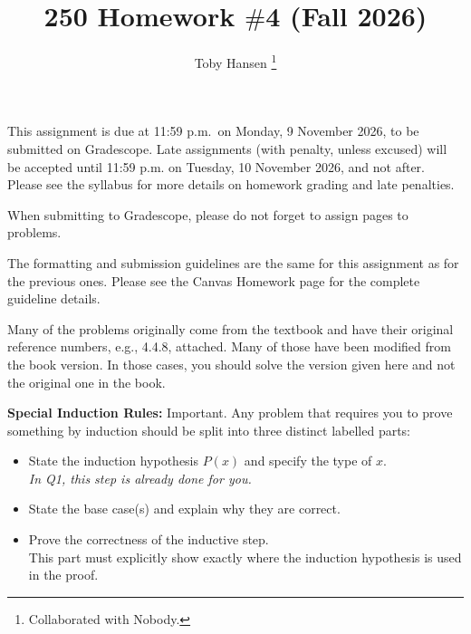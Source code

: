 \documentclass[12pt]{article}
\title{250 Homework $\#$4 (Fall 2026)}
\author{Toby Hansen \footnote{Collaborated with Nobody.}}
\begin{document}
	\date{}
	\maketitle

	This assignment is due at 11:59 p.m.~on Monday, 9 November 2026, to be submitted
	on Gradescope. Late assignments (with penalty, unless excused) will be accepted
	until 11:59 p.m. on Tuesday, 10 November 2026, and not after. Please see the syllabus
	for more details on homework grading and late penalties.

	\medskip

	When submitting to Gradescope, please do not forget to assign pages to problems.



	\bigskip

	The formatting and submission guidelines are the same for this assignment as
	for the previous ones. Please see the Canvas Homework page for the complete guideline
	details.

	\medskip

	Many of the problems originally come from the textbook and have their original
	reference numbers, e.g., 4.4.8, attached. Many of those have been modified
	from the book version. In those cases, you should solve the version given here
	and not the original one in the book.


	\medskip

	{\bf Special Induction Rules:} Important. Any problem that requires you to prove
	something by induction should be split into three distinct labelled parts:

	\begin{itemize}
		\item[(i)] State the induction hypothesis $P(x)$ and specify the type of $x.$\\
			{\em \small In Q1, this step is already done for you.}

		\item[(ii)] State the base case(s) and explain why they are correct.

		\item[(iii)] Prove the correctness of the inductive step.\\
			This part must explicitly show exactly where the induction hypothesis is used
			in the proof.
	\end{itemize}
\end{document}
